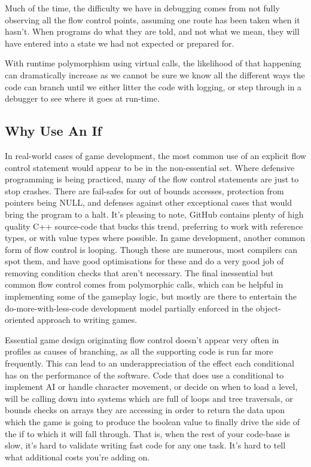 \documentclass[a4paper,12pt]{article}
\begin{document}
Much of the time, the difficulty we have in debugging comes from not fully observing all the flow control points, assuming one route has been taken when it hasn't.
When programs do what they are told, and not what we mean, they will have entered into a state we had not expected or prepared for.

With runtime polymorphism using virtual calls, the likelihood of that happening can dramatically increase as we cannot be sure we know all the different ways the code can branch until we either litter the code with logging, or step through in a debugger to see where it goes at run-time.

\subsection{Why Use An If}

In real-world cases of game development, the most common use of an explicit flow control statement would appear to be in the non-essential set.
Where defensive programming is being practiced, many of the flow control statements are just to stop crashes.
There are fail-safes for out of bounds accesses, protection from pointers being NULL, and defenses against other exceptional cases that would bring the program to a halt.
It's pleasing to note, GitHub contains plenty of high quality C++ source-code that bucks this trend, preferring to work with reference types, or with value types where possible.
In game development, another common form of flow control is looping.
Though these are numerous, most compilers can spot them, and have good optimisations for these and do a very good job of removing condition checks that aren't necessary.
The final inessential but common flow control comes from polymorphic calls, which can be helpful in implementing some of the gameplay logic, but mostly are there to entertain the do-more-with-less-code development model partially enforced in the object-oriented approach to writing games.

Essential game design originating flow control doesn't appear very often in profiles as causes of branching, as all the supporting code is run far more frequently.
This can lead to an underappreciation of the effect each conditional has on the performance of the software.
Code that does use a conditional to implement AI or handle character movement, or decide on when to load a level, will be calling down into systems which are full of loops and tree traversals, or bounds checks on arrays they are accessing in order to return the data upon which the game is going to produce the boolean value to finally drive the side of the if to which it will fall through.
That is, when the rest of your code-base is slow, it's hard to validate writing fast code for any one task.
It's hard to tell what additional costs you're adding on.
\end{document}
